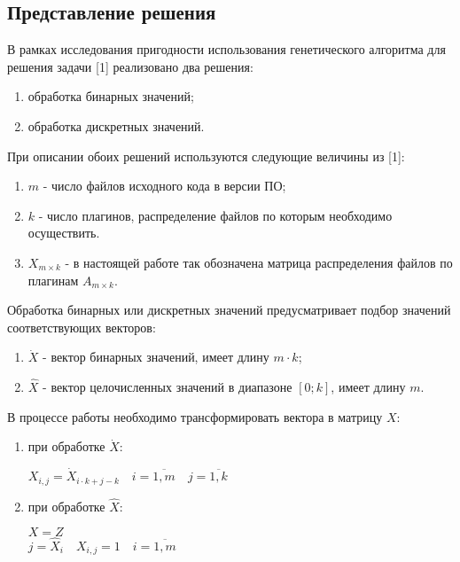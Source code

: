 \subsection*{Представление решения}
В рамках исследования пригодности использования генетического алгоритма для решения задачи [1] реализовано два решения:
\begin{enumerate}
  \item обработка бинарных значений;
  \item обработка дискретных значений.
\end{enumerate}

При описании обоих решений используются следующие величины из [1]:
\begin{enumerate}
  \item $m$ - число файлов исходного кода в версии ПО;
  \item $k$ - число плагинов, распределение файлов по которым необходимо осуществить.
  \item $X_{m \times k}$ - в настоящей работе так обозначена матрица распределения файлов по плагинам $A_{m \times k}$.
\end{enumerate}

Обработка бинарных или дискретных значений предусматривает подбор значений соответствующих векторов:
\begin{enumerate}
  \item $\dot{X}$ - вектор бинарных значений, имеет длину $m \cdot k$;
  \item $\hat{X}$ - вектор целочисленных значений в диапазоне $[0; k]$, имеет длину $m$.
\end{enumerate}

В процессе работы необходимо трансформировать вектора в матрицу $X$:
\begin{enumerate}
  \item при обработке $\dot{X}$:
  \begin{center}
    $X_{i, j} = \dot{X}_{i \cdot k + j - k} \quad i=\overline{1, m} \quad j=\overline{1, k}$
  \end{center}
  \item при обработке $\hat{X}$:
  \begin{center}
    $X = Z$ \\
    $j = \hat{X}_{i} \quad X_{i, j} = 1 \quad i=\overline{1, m}$
  \end{center}
\end{enumerate}

